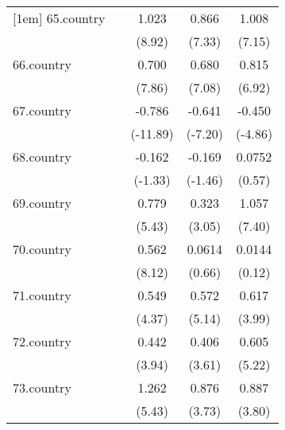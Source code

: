 {\begin{tabular}{l*{4}{c}}
[1em]
65.country  &                     &       1.023\sym{***}&       0.866\sym{***}&       1.008\sym{***}\\
            &                     &      (8.92)         &      (7.33)         &      (7.15)         \\
[1em]
66.country  &                     &       0.700\sym{***}&       0.680\sym{***}&       0.815\sym{***}\\
            &                     &      (7.86)         &      (7.08)         &      (6.92)         \\
[1em]
67.country  &                     &      -0.786\sym{***}&      -0.641\sym{***}&      -0.450\sym{***}\\
            &                     &    (-11.89)         &     (-7.20)         &     (-4.86)         \\
[1em]
68.country  &                     &      -0.162         &      -0.169         &      0.0752         \\
            &                     &     (-1.33)         &     (-1.46)         &      (0.57)         \\
[1em]
69.country  &                     &       0.779\sym{***}&       0.323\sym{**} &       1.057\sym{***}\\
            &                     &      (5.43)         &      (3.05)         &      (7.40)         \\
[1em]
70.country  &                     &       0.562\sym{***}&      0.0614         &      0.0144         \\
            &                     &      (8.12)         &      (0.66)         &      (0.12)         \\
[1em]
71.country  &                     &       0.549\sym{***}&       0.572\sym{***}&       0.617\sym{***}\\
            &                     &      (4.37)         &      (5.14)         &      (3.99)         \\
[1em]
72.country  &                     &       0.442\sym{***}&       0.406\sym{***}&       0.605\sym{***}\\
            &                     &      (3.94)         &      (3.61)         &      (5.22)         \\
[1em]
73.country  &                     &       1.262\sym{***}&       0.876\sym{***}&       0.887\sym{***}\\
            &                     &      (5.43)         &      (3.73)         &      (3.80)         \\

\end{tabular}}
